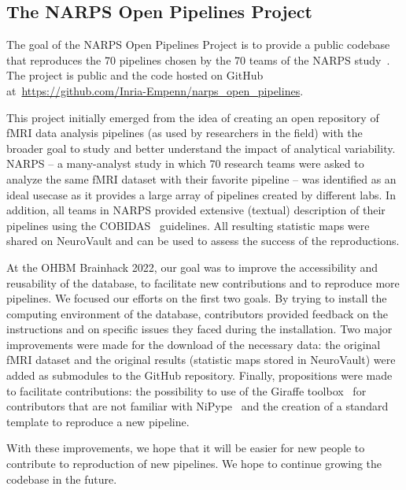 \documentclass[../main.tex]{subfiles}
\begin{document}
\subsection{The NARPS Open Pipelines Project}


The goal of the NARPS Open Pipelines Project is to provide a public codebase that reproduces the 70 pipelines chosen by the 70 teams of the NARPS study~\citep{botviniknezer2020}. The project is public and the code hosted on GitHub at~\url{https://github.com/Inria-Empenn/narps_open_pipelines}.

This project initially emerged from the idea of creating an open repository of fMRI data analysis pipelines (as used by researchers in the field) with the broader goal to study and better understand the impact of analytical variability. NARPS -- a many-analyst study in which 70 research teams were asked to analyze the same fMRI dataset with their favorite pipeline -- was identified as an ideal usecase as it provides a large array of pipelines created by different labs. In addition, all teams in NARPS provided extensive (textual) description of their pipelines using the COBIDAS~\citep{nichols2017} guidelines. All resulting statistic maps were shared on NeuroVault \citep{gorgolewski2015} and can be used to assess the success of the reproductions. 

At the OHBM Brainhack 2022, our goal was to improve the accessibility and reusability of the database, to facilitate new contributions and to reproduce more pipelines. We focused our efforts on the first two goals. By trying to install the computing environment of the database, contributors provided feedback on the instructions and on specific issues they faced during the installation. Two major improvements were made for the download of the necessary data: the original fMRI dataset and the original results (statistic maps stored in NeuroVault) were added as submodules to the GitHub repository. Finally, propositions were made to facilitate contributions: the possibility to use of the Giraffe toolbox~\citep{vanMourik2016} for contributors that are not familiar with NiPype~\citep{gorgolewski2017} and the creation of a standard template to reproduce a new pipeline. 

With these improvements, we hope that it will be easier for new people to contribute to reproduction of new pipelines. We hope to continue growing the codebase in the future. 
\end{document}

